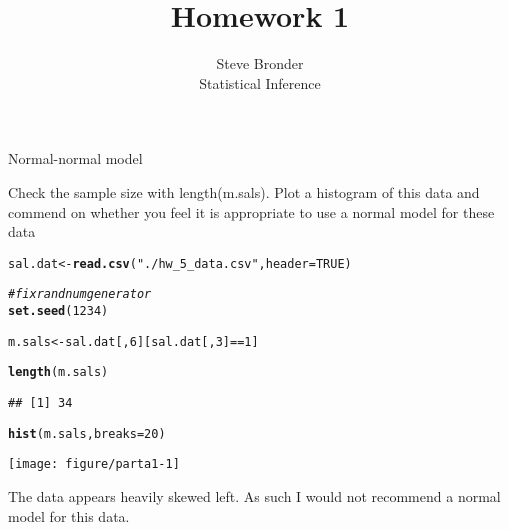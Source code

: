 \documentclass[12pt]{article}\usepackage[]{graphicx}\usepackage[]{color}
\makeatletter
\def\maxwidth{ %
  \ifdim\Gin@nat@width>\linewidth
    \linewidth
  \else
    \Gin@nat@width
  \fi
}
\newcommand{\hlnum}[1]{\textcolor[rgb]{0.686,0.059,0.569}{#1}}%
\newcommand{\hlstr}[1]{\textcolor[rgb]{0.192,0.494,0.8}{#1}}%
\newcommand{\hlcom}[1]{\textcolor[rgb]{0.678,0.584,0.686}{\textit{#1}}}%
\newcommand{\hlopt}[1]{\textcolor[rgb]{0,0,0}{#1}}%
\newcommand{\hlstd}[1]{\textcolor[rgb]{0.345,0.345,0.345}{#1}}%
\newcommand{\hlkwb}[1]{\textcolor[rgb]{0.69,0.353,0.396}{#1}}%
\newcommand{\hlkwc}[1]{\textcolor[rgb]{0.333,0.667,0.333}{#1}}%
\newcommand{\hlkwd}[1]{\textcolor[rgb]{0.737,0.353,0.396}{\textbf{#1}}}%
\newenvironment{kframe}{%
 \def\at@end@of@kframe{}%
 \ifinner\ifhmode%
  \def\at@end@of@kframe{\end{minipage}}%
  \begin{minipage}{\columnwidth}%
 \fi\fi%
 \def\FrameCommand##1{\hskip\@totalleftmargin \hskip-\fboxsep
 \colorbox{shadecolor}{##1}\hskip-\fboxsep
     \hskip-\linewidth \hskip-\@totalleftmargin \hskip\columnwidth}%
 \MakeFramed {\advance\hsize-\width
   \@totalleftmargin\z@ \linewidth\hsize
   \@setminipage}}%
 {\par\unskip\endMakeFramed%
 \at@end@of@kframe}
\newenvironment{knitrout}{}{} %
\newenvironment{exercise}[2][Exercise]{\begin{trivlist}
\item[\hskip \labelsep {\bfseries #1}\hskip \labelsep {\bfseries #2.}]}{\end{trivlist}}
\newenvironment{problem}[2][Problem]{\begin{trivlist}
\item[\hskip \labelsep {\bfseries #1}\hskip \labelsep {\bfseries #2.}]}{\end{trivlist}}
\makeatother
\begin{document}
 
 
\title{Homework 1}%
\author{Steve Bronder\\ %
Statistical Inference} %
 
\maketitle
 
\begin{exercise}{1}Normal-normal model
\end{exercise}
\begin{problem}{a}
Check the sample size with length(m.sals). Plot a histogram of this data and commend on whether you feel it is appropriate to use a normal model for these data
\end{problem}
\begin{knitrout}
\color{fgcolor}\begin{kframe}
\begin{alltt}
\hlstd{sal.dat} \hlkwb{<-} \hlkwd{read.csv}\hlstd{(}\hlstr{"./hw_5_data.csv"}\hlstd{,}\hlkwc{header}\hlstd{=}\hlnum{TRUE}\hlstd{)}

\hlcom{#fix rand num generator}
\hlkwd{set.seed}\hlstd{(}\hlnum{1234}\hlstd{)}

\hlstd{m.sals} \hlkwb{<-} \hlstd{sal.dat[,}\hlnum{6}\hlstd{][sal.dat[,}\hlnum{3}\hlstd{]}\hlopt{==}\hlnum{1}\hlstd{]}

\hlkwd{length}\hlstd{(m.sals)}
\end{alltt}
\begin{verbatim}
## [1] 34
\end{verbatim}
\begin{alltt}
\hlkwd{hist}\hlstd{(m.sals,}\hlkwc{breaks}\hlstd{=}\hlnum{20}\hlstd{)}
\end{alltt}
\end{kframe}

{\centering \texttt{[image: figure/parta1-1]} 

}



\end{knitrout}
 The data appears heavily skewed left. As such I would not recommend a normal model for this data.
 
\end{document}
